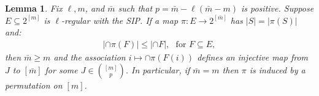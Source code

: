 \documentclass[9pt,twocolumn]{pnas-new}
\newtheorem{lemma}{Lemma}
\begin{document}

\begin{lemma}\label{NonEmptyLemma} 
Fix $\ell, m$, and $\bar m$ such that $p = \bar m - \ell(\bar m - m)$ is positive. Suppose $E \subseteq 2^{[m]}$ is $\ell$-regular with the SIP. If a map $\pi: E \to 2^{[\bar m]}$ has $|S| = |\pi(S)|$ and:
\begin{align}\label{cond}
|\cap \pi(F)| \leq |\cap F |,\ \ \   \text{for } F \subseteq E,
\end{align}
then $\bar m \geq m$ and the association $i \mapsto \cap \pi(F(i))$ defines an injective map from $J$ to $[\bar m]$ for some $J \in {[m] \choose p}$. In particular, if $\bar m = m$ then $\pi$ is induced by a permutation on $[m]$.
\end{lemma}
\end{document}
